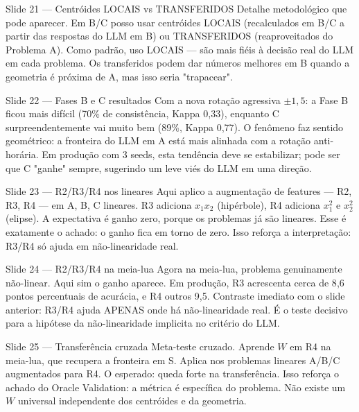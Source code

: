 \documentclass[aspectratio=169,10pt]{beamer}
\begin{document}
\begin{frame}{Slide 21 --- Centr\'oides LOCAIS vs TRANSFERIDOS}
\footnotesize
Detalhe metodol\'ogico que pode aparecer. Em B/C posso usar centr\'oides LOCAIS (recalculados em B/C a partir das respostas do LLM em B) ou TRANSFERIDOS (reaproveitados do Problema A). Como padr\~ao, uso LOCAIS --- s\~ao mais fi\'eis \`a decis\~ao real do LLM em cada problema. Os transferidos podem dar n\'umeros melhores em B quando a geometria \'e pr\'oxima de A, mas isso seria "trapacear".
\end{frame}

\begin{frame}{Slide 22 --- Fases B e C resultados}
\footnotesize
Com a nova rota\c{c}\~ao agressiva $\pm 1{,}5$: a Fase B ficou mais dif\'icil (70\% de consist\^encia, Kappa 0{,}33), enquanto C surpreendentemente vai muito bem (89\%, Kappa 0{,}77). O fen\^omeno faz sentido geom\'etrico: a fronteira do LLM em A est\'a mais alinhada com a rota\c{c}\~ao anti-hor\'aria. Em produ\c{c}\~ao com 3 seeds, esta tend\^encia deve se estabilizar; pode ser que C "ganhe" sempre, sugerindo um leve vi\'es do LLM em uma dire\c{c}\~ao.
\end{frame}

\begin{frame}{Slide 23 --- R2/R3/R4 nos lineares}
\footnotesize
Aqui aplico a augmenta\c{c}\~ao de features --- R2, R3, R4 --- em A, B, C lineares. R3 adiciona $x_1 x_2$ (hip\'erbole), R4 adiciona $x_1^2$ e $x_2^2$ (elipse). A expectativa \'e ganho zero, porque os problemas j\'a s\~ao lineares. Esse \'e exatamente o achado: o ganho fica em torno de zero. Isso refor\c{c}a a interpreta\c{c}\~ao: R3/R4 s\'o ajuda em n\~ao-linearidade real.
\end{frame}

\begin{frame}{Slide 24 --- R2/R3/R4 na meia-lua}
\footnotesize
Agora na meia-lua, problema genuinamente n\~ao-linear. Aqui sim o ganho aparece. Em produ\c{c}\~ao, R3 acrescenta cerca de 8{,}6 pontos percentuais de acur\'acia, e R4 outros 9{,}5. Contraste imediato com o slide anterior: R3/R4 ajuda APENAS onde h\'a n\~ao-linearidade real. \'E o teste decisivo para a hip\'otese da n\~ao-linearidade implicita no crit\'erio do LLM.
\end{frame}

\begin{frame}{Slide 25 --- Transfer\^encia cruzada}
\footnotesize
Meta-teste cruzado. Aprende $W$ em R4 na meia-lua, que recupera a fronteira em S. Aplica nos problemas lineares A/B/C augmentados para R4. O esperado: queda forte na transfer\^encia. Isso refor\c{c}a o achado do Oracle Validation: a m\'etrica \'e espec\'ifica do problema. N\~ao existe um $W$ universal independente dos centr\'oides e da geometria.
\end{frame}
\end{document}
